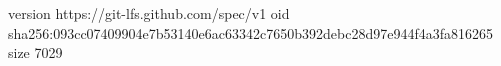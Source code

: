version https://git-lfs.github.com/spec/v1
oid sha256:093cc07409904e7b53140e6ac63342c7650b392debc28d97e944f4a3fa816265
size 7029
